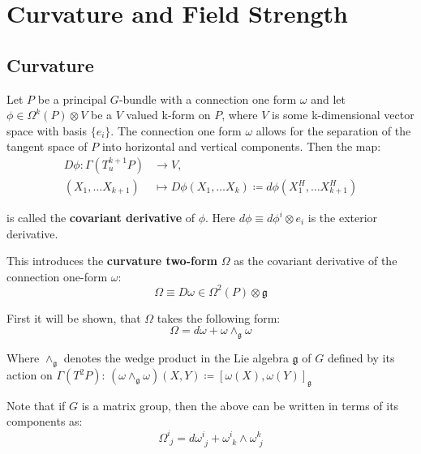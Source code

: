 
\chapter{Curvature and Field Strength}

\section{Curvature}

Let $P$ be a principal $G$-bundle with a connection one form $\omega$ and let $\phi \in \Omega^k(P) \otimes V$ be a $V$ valued k-form on $P$, where $V$ is some k-dimensional vector space with basis $\{e_i\}$. The connection one form $\omega$ allows for the separation of the tangent space of $P$ into horizontal and vertical components. Then the map:
\begin{align*}
  D\phi : \Gamma(T^{k+1}_uP) & \to V , \\
  (X_1,\dots X_{k+1})& \mapsto D\phi(X_1, \dots X_k) \coloneq d\phi(X^H_1,\dots X^H_{k+1})
\end{align*}

is called the \textbf{covariant derivative} of $\phi$. Here $d\phi \equiv d \phi^i \otimes e_i$ is the exterior derivative.

This introduces the \textbf{curvature two-form} $\Omega$ as the covariant derivative of the connection one-form $\omega$:
\[ \Omega \equiv D\omega \in \Omega^2(P) \otimes \mathfrak{g} \]

First it will be shown, that $\Omega$ takes the following form:
\[ \Omega = d\omega + \omega \wedge_{\mathfrak{g}} \omega \]

Where $\wedge_{\mathfrak{g}}$ denotes the wedge product in the Lie algebra $\mathfrak{g}$ of $G$ defined by its action on $\Gamma(T^2P)$: $(\omega \wedge_\mathfrak{g}\omega)(X,Y) \coloneq [ \omega(X), \omega(Y) ]_\mathfrak{g}$

Note that if $G$ is a matrix group, then the above can be written in terms of its components as:
\[ \Omega^i_{\,\,j} = d\omega^i_{\,\,j} + \omega^i_{\,\,k} \wedge \omega^k_{\,\,j} \] 

